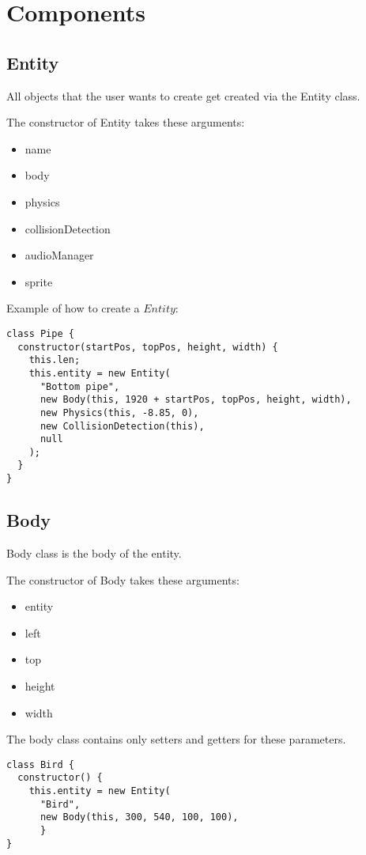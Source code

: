 \chapter{Components}
\section{Entity}

All objects that the user wants to create get created via the Entity class.



The constructor of Entity takes these arguments:

\begin{itemize}
	\item name
  \item body
  \item physics
  \item collisionDetection
  \item audioManager
  \item sprite
\end{itemize}


Example of how to create a $Entity$:

\begin{lstlisting}
class Pipe {
  constructor(startPos, topPos, height, width) {
    this.len;
    this.entity = new Entity(
      "Bottom pipe",
      new Body(this, 1920 + startPos, topPos, height, width),
      new Physics(this, -8.85, 0),
      new CollisionDetection(this),
      null
    );
  }
}
\end{lstlisting}


\section{Body}
Body class is the body of the entity.  

The constructor of Body takes these arguments:

\begin{itemize}
	\item entity
    \item left
    \item top
    \item height
    \item width
\end{itemize}

The body class contains only setters and getters for these parameters.

\begin{lstlisting}
class Bird {
  constructor() {
    this.entity = new Entity(
      "Bird",
      new Body(this, 300, 540, 100, 100),
      }
}
\end{lstlisting}

